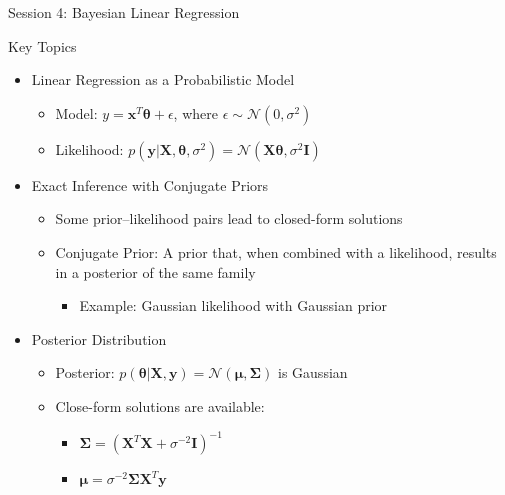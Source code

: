\documentclass{beamer}
\begin{document}
\begin{frame}{Session 4: Bayesian Linear Regression}
  \begin{block}{Key Topics}
    \begin{itemize}
    \item Linear Regression as a Probabilistic Model
      \begin{itemize}
        \item Model: $y = \boldsymbol{x}^T \boldsymbol{\theta} + \epsilon$, where $\epsilon \sim \mathcal{N}(0, \sigma^2)$
        \item Likelihood: $p(\boldsymbol{y} | \boldsymbol{X}, \boldsymbol{\theta}, \sigma^2) = \mathcal{N}(\boldsymbol{X}\boldsymbol{\theta}, \sigma^2\boldsymbol{I})$
      \end{itemize}
    \item Exact Inference with Conjugate Priors
      \begin{itemize}
      \item Some prior--likelihood pairs lead to closed-form solutions
      \item Conjugate Prior: A prior that, when combined with a likelihood, results in a posterior of the same family
        \begin{itemize}
        \item Example: Gaussian likelihood with Gaussian prior
        \end{itemize}
      \end{itemize}
    \item Posterior Distribution
      \begin{itemize}
        \item Posterior: $p(\boldsymbol{\theta} | \boldsymbol{X}, \boldsymbol{y}) = \mathcal{N}(\boldsymbol{\mu}, \boldsymbol{\Sigma})$ is Gaussian
        \item Close-form solutions are available:
          \begin{itemize}
            \item $\boldsymbol{\Sigma} = (\boldsymbol{X}^T\boldsymbol{X} + \sigma^{-2}\boldsymbol{I})^{-1}$
            \item $\boldsymbol{\mu} = \sigma^{-2}\boldsymbol{\Sigma}\boldsymbol{X}^T\boldsymbol{y}$
          \end{itemize}
        \end{itemize}
\end{itemize}
  \end{block}
\end{frame}
\end{document}
